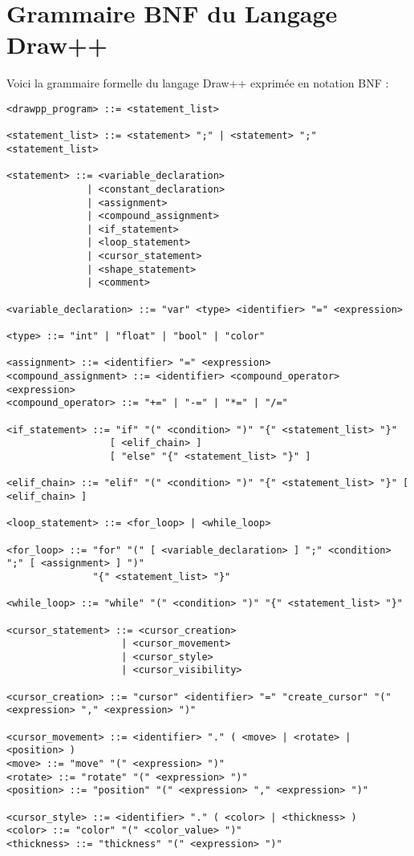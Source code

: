 \documentclass[12pt,a4paper]{report}
\begin{document}
\section{Grammaire BNF du Langage Draw++}
Voici la grammaire formelle du langage Draw++ exprimée en notation BNF :
\begin{lstlisting}
<drawpp_program> ::= <statement_list>

<statement_list> ::= <statement> ";" | <statement> ";" <statement_list>

<statement> ::= <variable_declaration>
              | <constant_declaration>
              | <assignment>
              | <compound_assignment>
              | <if_statement>
              | <loop_statement>
              | <cursor_statement>
              | <shape_statement>
              | <comment>

<variable_declaration> ::= "var" <type> <identifier> "=" <expression>

<type> ::= "int" | "float" | "bool" | "color"

<assignment> ::= <identifier> "=" <expression>
<compound_assignment> ::= <identifier> <compound_operator> <expression>
<compound_operator> ::= "+=" | "-=" | "*=" | "/="

<if_statement> ::= "if" "(" <condition> ")" "{" <statement_list> "}"
                  [ <elif_chain> ]
                  [ "else" "{" <statement_list> "}" ]

<elif_chain> ::= "elif" "(" <condition> ")" "{" <statement_list> "}" [ <elif_chain> ]

<loop_statement> ::= <for_loop> | <while_loop>

<for_loop> ::= "for" "(" [ <variable_declaration> ] ";" <condition> ";" [ <assignment> ] ")"
               "{" <statement_list> "}"

<while_loop> ::= "while" "(" <condition> ")" "{" <statement_list> "}"

<cursor_statement> ::= <cursor_creation>
                    | <cursor_movement>
                    | <cursor_style>
                    | <cursor_visibility>

<cursor_creation> ::= "cursor" <identifier> "=" "create_cursor" "(" <expression> "," <expression> ")"

<cursor_movement> ::= <identifier> "." ( <move> | <rotate> | <position> )
<move> ::= "move" "(" <expression> ")"
<rotate> ::= "rotate" "(" <expression> ")"
<position> ::= "position" "(" <expression> "," <expression> ")"

<cursor_style> ::= <identifier> "." ( <color> | <thickness> )
<color> ::= "color" "(" <color_value> ")"
<thickness> ::= "thickness" "(" <expression> ")"


\end{lstlisting}
\end{document}
